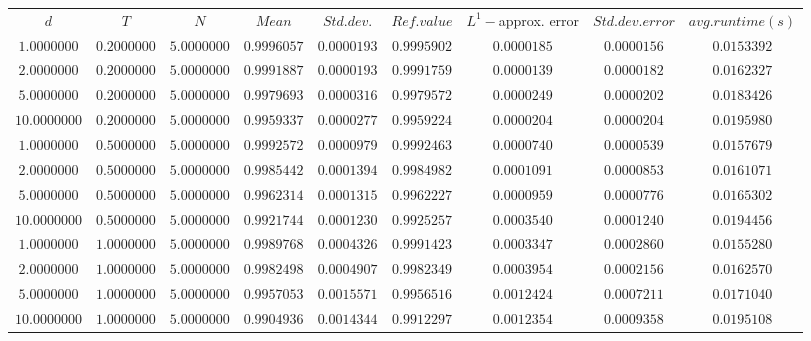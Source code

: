 \begin{tabular}{ccccccccc}
$d$ & $T$ & $N$ & $Mean$ & $Std. dev.$ & $Ref. value$ & $L^1-$approx. error & $Std. dev. error$ & $avg. runtime (s)$\\
$1.0000000$ & $0.2000000$ & $5.0000000$ & $0.9996057$ & $0.0000193$ & $0.9995902$ & $0.0000185$ & $0.0000156$ & $0.0153392$\\
$2.0000000$ & $0.2000000$ & $5.0000000$ & $0.9991887$ & $0.0000193$ & $0.9991759$ & $0.0000139$ & $0.0000182$ & $0.0162327$\\
$5.0000000$ & $0.2000000$ & $5.0000000$ & $0.9979693$ & $0.0000316$ & $0.9979572$ & $0.0000249$ & $0.0000202$ & $0.0183426$\\
$10.0000000$ & $0.2000000$ & $5.0000000$ & $0.9959337$ & $0.0000277$ & $0.9959224$ & $0.0000204$ & $0.0000204$ & $0.0195980$\\
$1.0000000$ & $0.5000000$ & $5.0000000$ & $0.9992572$ & $0.0000979$ & $0.9992463$ & $0.0000740$ & $0.0000539$ & $0.0157679$\\
$2.0000000$ & $0.5000000$ & $5.0000000$ & $0.9985442$ & $0.0001394$ & $0.9984982$ & $0.0001091$ & $0.0000853$ & $0.0161071$\\
$5.0000000$ & $0.5000000$ & $5.0000000$ & $0.9962314$ & $0.0001315$ & $0.9962227$ & $0.0000959$ & $0.0000776$ & $0.0165302$\\
$10.0000000$ & $0.5000000$ & $5.0000000$ & $0.9921744$ & $0.0001230$ & $0.9925257$ & $0.0003540$ & $0.0001240$ & $0.0194456$\\
$1.0000000$ & $1.0000000$ & $5.0000000$ & $0.9989768$ & $0.0004326$ & $0.9991423$ & $0.0003347$ & $0.0002860$ & $0.0155280$\\
$2.0000000$ & $1.0000000$ & $5.0000000$ & $0.9982498$ & $0.0004907$ & $0.9982349$ & $0.0003954$ & $0.0002156$ & $0.0162570$\\
$5.0000000$ & $1.0000000$ & $5.0000000$ & $0.9957053$ & $0.0015571$ & $0.9956516$ & $0.0012424$ & $0.0007211$ & $0.0171040$\\
$10.0000000$ & $1.0000000$ & $5.0000000$ & $0.9904936$ & $0.0014344$ & $0.9912297$ & $0.0012354$ & $0.0009358$ & $0.0195108$\\
\end{tabular}
